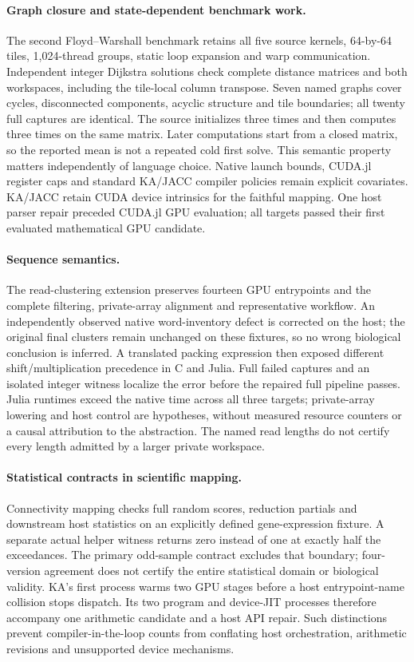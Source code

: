 \paragraph{Graph closure and state-dependent benchmark work.}
The second Floyd--Warshall benchmark retains all five source kernels, 64-by-64 tiles, 1,024-thread groups, static loop expansion and warp communication. Independent integer Dijkstra solutions check complete distance matrices and both workspaces, including the tile-local column transpose. Seven named graphs cover cycles, disconnected components, acyclic structure and tile boundaries; all twenty full captures are identical. The source initializes three times and then computes three times on the same matrix. Later computations start from a closed matrix, so the reported mean is not a repeated cold first solve. This semantic property matters independently of language choice. Native launch bounds, CUDA.jl register caps and standard KA/JACC compiler policies remain explicit covariates. KA/JACC retain CUDA device intrinsics for the faithful mapping. One host parser repair preceded CUDA.jl GPU evaluation; all targets passed their first evaluated mathematical GPU candidate.

\paragraph{Sequence semantics.}
The read-clustering extension preserves fourteen GPU entrypoints and the complete filtering, private-array alignment and representative workflow. An independently observed native word-inventory defect is corrected on the host; the original final clusters remain unchanged on these fixtures, so no wrong biological conclusion is inferred. A translated packing expression then exposed different shift/multiplication precedence in C and Julia. Full failed captures and an isolated integer witness localize the error before the repaired full pipeline passes. Julia runtimes exceed the native time across all three targets; private-array lowering and host control are hypotheses, without measured resource counters or a causal attribution to the abstraction. The named read lengths do not certify every length admitted by a larger private workspace.

\paragraph{Statistical contracts in scientific mapping.}
Connectivity mapping checks full random scores, reduction partials and downstream host statistics on an explicitly defined gene-expression fixture. A separate actual helper witness returns zero instead of one at exactly half the exceedances. The primary odd-sample contract excludes that boundary; four-version agreement does not certify the entire statistical domain or biological validity. KA's first process warms two GPU stages before a host entrypoint-name collision stops dispatch. Its two program and device-JIT processes therefore accompany one arithmetic candidate and a host API repair. Such distinctions prevent compiler-in-the-loop counts from conflating host orchestration, arithmetic revisions and unsupported device mechanisms.

